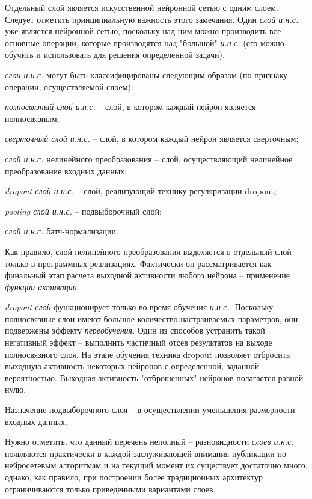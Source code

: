 Отдельный слой является искусственной нейронной сетью с одним слоем.
Следует отметить принципиальную важность этого замечания. Один \textit{слой и.н.с.} уже является нейронной сетью, поскольку над ним можно производить все основные операции, которые производятся над "большой"{} \textit{и.н.с.} (его можно обучить и использовать для решения определенной задачи).

\textit{слои и.н.с.} могут быть классифицированы следующим образом (по признаку операции, осуществляемой слоем):
\begin{textitemize}
	\item \textit{полносвязный слой и.н.с.} -- слой, в котором каждый нейрон является полносвязным;
	\item \textit{сверточный слой и.н.с.} -- слой, в котором каждый нейрон является сверточным;
	\item \textit{слой и.н.с.} нелинейного преобразования -- слой, осуществляющий нелинейное преобразование входных данных;
	\item \textit{dropout слой и.н.с.} -- слой, реализующий технику регуляризации dropout;
	\item \textit{pooling слой и.н.с.} -- подвыборочный слой;
	\item \textit{слой и.н.с.} батч-нормализации.
\end{textitemize}

Как правило, слой нелинейного преобразования выделяется в отдельный слой только в программных реализациях. Фактически он рассматривается как финальный этап расчета выходной активности любого нейрона -- применение \textit{функции активации}.

\textit{dropout-слой} функционирует только во время обучения \textit{и.н.с.}. Поскольку полносвязные слои имеют большое количество настраиваемых параметров, они подвержены эффекту \textit{переобучения}. Один из способов устранить такой негативный эффект -- выполнить частичный отсев результатов на выходе полносвязного слоя. На этапе обучения техника dropout позволяет отбросить выходную активность некоторых нейронов с определенной, заданной вероятностью. Выходная активность "отброшенных"{} нейронов полагается равной нулю.

Назначение подвыборочного слоя -- в осуществлении уменьшения размерности входных данных.

Нужно отметить, что данный перечень неполный -- разновидности \textit{слоев и.н.с.} появляются практически в каждой заслуживающей внимания публикации по нейросетевым алгоритмам и на текущий момент их существует достаточно много, однако, как правило, при построении более традиционных архитектур ограничиваются только приведенными вариантами слоев.

